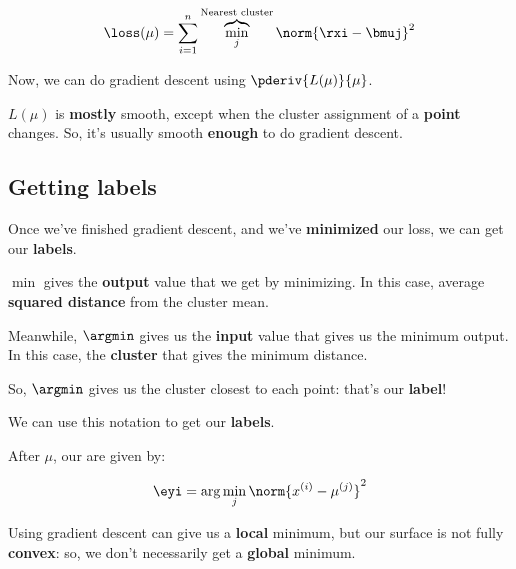         \begin{equation}
            \loss(\mu) =
            \sum_{i=1}^n 
            \overbrace{
                    \min_{j} 
            }^{\text{Nearest cluster}}
                    \norm{ \rxi - \bmuj }^2 
        \end{equation}
        
        Now, we can do gradient descent using $\pderiv{L(\mu)}{\mu}$. 
        
        $L(\mu)$ is \textbf{mostly} smooth, except when the cluster assignment of a \textbf{point} changes. So, it's usually smooth \textbf{enough} to do gradient descent.
    
    \subsection*{Getting labels}
        
        Once we've finished gradient descent, and we've \textbf{minimized} our loss, we can get our \textbf{labels}.
        
        $\min$ gives the \textbf{output} value that we get by minimizing. In this case, average \textbf{squared distance} from the cluster mean.
        
        Meanwhile, $\argmin$ gives us the \textbf{input} value that gives us the minimum output. In this case, the \textbf{cluster} that gives the minimum distance. 
        
        So, $\argmin$ gives us the cluster closest to each point: that's our \textbf{label}!
        
        We can use this notation to get our \textbf{labels}.\\
        
        \begin{notation}
            After  $\mu$, our  are given by:
            
            \begin{equation}
                \eyi = \arg\min_j \norm{ x^{(i)} - \mu^{(j)} }^2
            \end{equation}
        \end{notation}
        
        Using gradient descent can give us a \textbf{local} minimum, but our surface is not fully \textbf{convex}: so, we don't necessarily get a \textbf{global} minimum.
